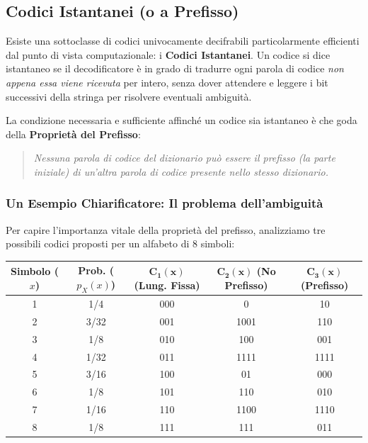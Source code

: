 \subsection{Codici Istantanei (o a Prefisso)}

Esiste una sottoclasse di codici univocamente decifrabili particolarmente efficienti dal punto di vista computazionale: i \textbf{Codici Istantanei}.
Un codice si dice istantaneo se il decodificatore è in grado di tradurre ogni parola di codice \textit{non appena essa viene ricevuta} per intero, senza dover attendere e leggere i bit successivi della stringa per risolvere eventuali ambiguità.

La condizione necessaria e sufficiente affinché un codice sia istantaneo è che goda della \textbf{Proprietà del Prefisso}:
\begin{quote}
\textit{Nessuna parola di codice del dizionario può essere il prefisso (la parte iniziale) di un'altra parola di codice presente nello stesso dizionario.}
\end{quote}

\subsubsection{Un Esempio Chiarificatore: Il problema dell'ambiguità}

Per capire l'importanza vitale della proprietà del prefisso, analizziamo tre possibili codici proposti per un alfabeto di 8 simboli:

\begin{table}[h]
\centering
\renewcommand{\arraystretch}{1.2}
\begin{tabular}{|c|c|c|c|c|}
\hline
\textbf{Simbolo} ($x$) & \textbf{Prob.} ($p_X(x)$) & $\mathbf{C_1(x)}$ (Lung. Fissa) & $\mathbf{C_2(x)}$ (No Prefisso) & $\mathbf{C_3(x)}$ (Prefisso) \\ \hline
1 & 1/4  & 000 & 0    & 10   \\ \hline
2 & 3/32 & 001 & 1001 & 110  \\ \hline
3 & 1/8  & 010 & 100  & 001  \\ \hline
4 & 1/32 & 011 & 1111 & 1111 \\ \hline
5 & 3/16 & 100 & 01   & 000  \\ \hline
6 & 1/8  & 101 & 110  & 010  \\ \hline
7 & 1/16 & 110 & 1100 & 1110 \\ \hline
8 & 1/8  & 111 & 111  & 011  \\ \hline
\end{tabular}
\end{table}

